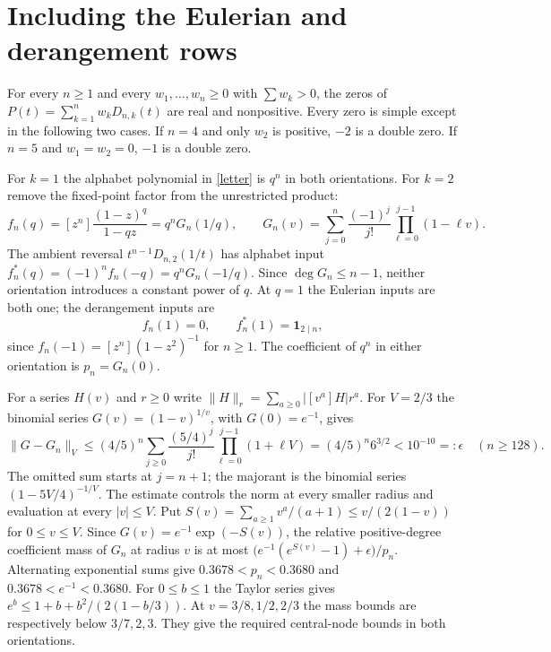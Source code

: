 \section{Including the Eulerian and derangement rows}

\begin{theorem}\label{allcuts}
For every $n\ge1$ and every $w_1,\ldots,w_n\ge0$ with $\sum w_k>0$,
the zeros of $P(t)=\sum_{k=1}^n w_kD_{n,k}(t)$ are real and nonpositive.
Every zero is simple except in the following two cases. If $n=4$ and only $w_2$ is positive, $-2$ is a double zero. If $n=5$ and $w_1=w_2=0$, $-1$ is a double zero.
\end{theorem}

For $k=1$ the alphabet polynomial in \eqref{letter} is $q^n$ in both orientations.
For $k=2$ remove the fixed-point factor from the unrestricted product:
\[
 f_n(q)=[z^n]\frac{(1-z)^q}{1-qz}=q^nG_n(1/q),\qquad
 G_n(v)=\sum_{j=0}^n\frac{(-1)^j}{j!}\prod_{\ell=0}^{j-1}(1-\ell v).
\]
The ambient reversal $t^{n-1}D_{n,2}(1/t)$ has alphabet input $f_n^*(q)=(-1)^nf_n(-q)=q^nG_n(-1/q)$.
Since $\deg G_n\le n-1$, neither orientation introduces a constant power of $q$.
At $q=1$ the Eulerian inputs are both one; the derangement inputs are
\[
 f_n(1)=0,\qquad f_n^*(1)=\mathbf1_{2\mid n},
\]
since $f_n(-1)=[z^n](1-z^2)^{-1}$ for $n\ge1$.
The coefficient of $q^n$ in either orientation is $p_n=G_n(0)$.

For a series $H(v)$ and $r\ge0$ write $\|H\|_r=\sum_{a\ge0}|[v^a]H|r^a$.
For $V=2/3$ the binomial series $G(v)=(1-v)^{1/v}$, with $G(0)=e^{-1}$, gives
\[
 \|G-G_n\|_V\le(4/5)^n\sum_{j\ge0}
 \frac{(5/4)^j}{j!}\prod_{\ell=0}^{j-1}(1+\ell V)
 = (4/5)^n6^{3/2}<10^{-10}=:\epsilon \quad(n\ge128).
\]
The omitted sum starts at $j=n+1$; the majorant is the binomial series $(1-5V/4)^{-1/V}$. The estimate controls the norm at every smaller radius and evaluation at every $|v|\le V$.
Put $S(v)=\sum_{a\ge1}v^a/(a+1)\le v/(2(1-v))$ for $0\le v\le V$.
Since $G(v)=e^{-1}\exp(-S(v))$, the relative positive-degree coefficient mass of $G_n$ at radius $v$ is at most $\bigl(e^{-1}(e^{S(v)}-1)+\epsilon\bigr)/p_n$.
Alternating exponential sums give $0.3678<p_n<0.3680$ and $0.3678<e^{-1}<0.3680$.
For $0\le b\le1$ the Taylor series gives
$e^b\le1+b+b^2/(2(1-b/3))$. At $v=3/8,1/2,2/3$ the mass bounds are respectively below $3/7,2,3$. They give the required central-node bounds in both orientations.

